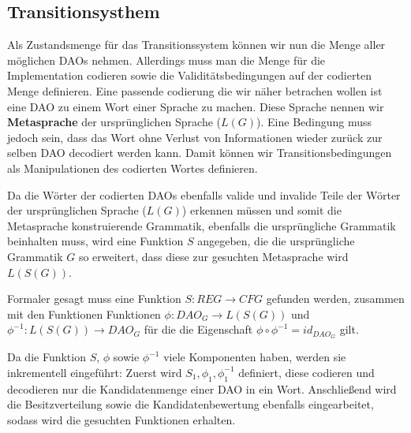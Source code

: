 \documentclass[]{article}
\begin{document}
% 

% 




\subsection*{Transitionsysthem}
Als Zustandsmenge für das Transitionssystem können wir nun die Menge aller möglichen DAOs nehmen. Allerdings muss man die Menge für die Implementation codieren sowie die Validitätsbedingungen auf der codierten Menge definieren. Eine passende codierung die wir näher betrachen wollen ist eine DAO zu einem Wort einer Sprache zu machen. Diese Sprache nennen wir \textbf{Metasprache} der ursprünglichen Sprache ($L(G)$). Eine Bedingung muss jedoch sein, dass das Wort ohne Verlust von Informationen wieder zurück zur selben DAO decodiert werden kann. Damit können wir Transitionsbedingungen als Manipulationen des codierten Wortes definieren. 

Da die Wörter der codierten DAOs ebenfalls valide und invalide Teile der Wörter der ursprünglichen Sprache ($L(G)$) erkennen müssen und somit die Metasprache konstruierende Grammatik, ebenfalls die ursprüngliche Grammatik beinhalten muss, wird eine Funktion $S$ angegeben, die die ursprüngliche Grammatik $G$ so erweitert, dass diese zur gesuchten Metasprache wird $L(S(G))$.

Formaler gesagt muss eine Funktion $S: REG\rightarrow CFG$ gefunden werden, zusammen mit den Funktionen Funktionen $\phi: DAO_G \rightarrow L(S(G))$ und $\phi^{-1}: L(S(G)) \rightarrow DAO_G$ für die die Eigenschaft $\phi\circ\phi^{-1} = id_{DAO_G}$ gilt.

Da die Funktion $S$, $\phi$ sowie $\phi^{-1}$ viele Komponenten haben, werden sie inkrementell eingeführt: Zuerst wird $S_1, \phi_1, \phi^{-1}_1$ definiert, diese codieren und decodieren nur die Kandidatenmenge einer DAO in ein Wort. Anschließend wird die Besitzverteilung sowie die Kandidatenbewertung ebenfalls eingearbeitet, sodass wird die gesuchten Funktionen erhalten.
\end{document}

